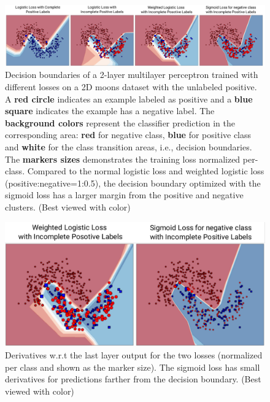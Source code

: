 \begin{figure}
\begin{center}
   \includegraphics[width=0.95\linewidth]{img/moons.pdf}
\end{center}
   \caption{
   Decision boundaries of a 2-layer multilayer perceptron trained with different losses on a 2D moons dataset with the unlabeled positive.
   A \textbf{red circle} indicates an example labeled as positive and a \textbf{blue square} indicates the example has a negative label.
   The \textbf{background colors} represent the classifier prediction in the corresponding area: \textbf{red} for negative class, \textbf{blue} for positive class and \textbf{white} for the class transition areas, i.e., decision boundaries.
   The \textbf{markers sizes} demonstrates the training loss normalized per-class.
   Compared to the normal logistic loss and weighted logistic loss (positive:negative=1:0.5), the decision boundary optimized with the sigmoid loss has a larger margin from the positive and negative clusters.
   (Best viewed with color)
   }
\label{fig:moons}
\end{figure}


\begin{figure}[t]
\begin{center}
   \includegraphics[width=\linewidth]{img/moons_diff}
\end{center}
   \caption{
   Derivatives w.r.t the last layer output for the two losses (normalized per class and shown as the marker size).
   The sigmoid loss has small derivatives for predictions farther from the decision boundary.
   (Best viewed with color)
   }
\label{fig:moonsdiff}
\end{figure}



